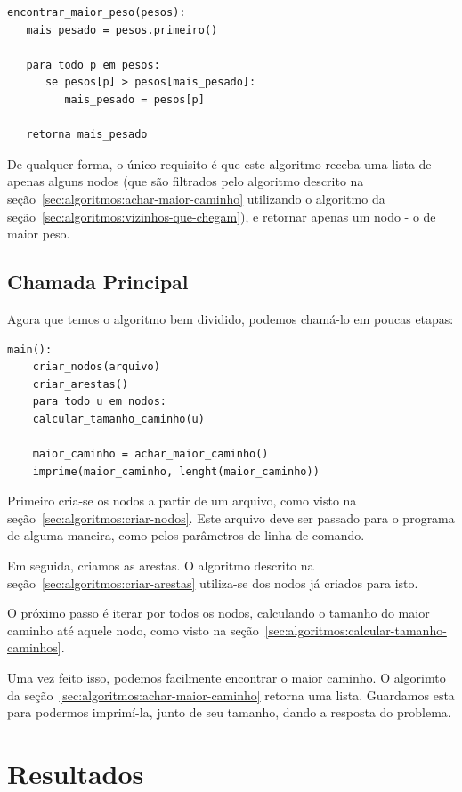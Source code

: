 \documentclass[12pt]{article}
\begin{document}
\begin{lstlisting}
encontrar_maior_peso(pesos):
   mais_pesado = pesos.primeiro()

   para todo p em pesos:
      se pesos[p] > pesos[mais_pesado]:
         mais_pesado = pesos[p]

   retorna mais_pesado
\end{lstlisting}

De qualquer forma, o único requisito é que este algoritmo receba uma lista de apenas alguns nodos (que são filtrados pelo algoritmo descrito na se\c{c}ão~\ref{sec:algoritmos:achar-maior-caminho} utilizando o algoritmo da se\c{c}ão~\ref{sec:algoritmos:vizinhos-que-chegam}), e retornar apenas um nodo - o de maior peso.

\subsection{Chamada Principal}\label{sec:algoritmos:main}
Agora que temos o algoritmo bem dividido, podemos chamá-lo em poucas etapas:

\begin{lstlisting}
main():
    criar_nodos(arquivo)
    criar_arestas()
    para todo u em nodos:
    calcular_tamanho_caminho(u)

    maior_caminho = achar_maior_caminho()
    imprime(maior_caminho, lenght(maior_caminho))
\end{lstlisting}

Primeiro cria-se os nodos a partir de um arquivo, como visto na se\c{c}ão~\ref{sec:algoritmos:criar-nodos}. Este arquivo deve ser passado para o programa de alguma maneira, como pelos parâmetros de linha de comando.

Em seguida, criamos as arestas. O algoritmo descrito na se\c{c}ão~\ref{sec:algoritmos:criar-arestas} utiliza-se dos nodos já criados para isto.

O próximo passo é iterar por todos os nodos, calculando o tamanho do maior caminho até aquele nodo, como visto na se\c{c}ão~\ref{sec:algoritmos:calcular-tamanho-caminhos}.

Uma vez feito isso, podemos facilmente encontrar o maior caminho. O algorimto da se\c{c}ão~\ref{sec:algoritmos:achar-maior-caminho} retorna uma lista. Guardamos esta para podermos imprimí-la, junto de seu tamanho, dando a resposta do problema.

\section{Resultados}\label{sec:resultados}
\end{document}
